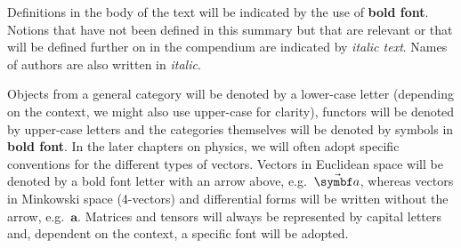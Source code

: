 \documentclass[12pt, a4paper]{report}
\begin{document}
   Definitions in the body of the text will be indicated by the use of \textbf{bold font}. Notions that have not been defined in this summary but that are relevant or that will be defined further on in the compendium are indicated by \textit{italic text}. Names of authors are also written in \textit{italic}.

   Objects from a general category will be denoted by a lower-case letter (depending on the context, we might also use upper-case for clarity), functors will be denoted by upper-case letters and the categories themselves will be denoted by symbols in \textbf{bold font}. In the later chapters on physics, we will often adopt specific conventions for the different types of vectors. Vectors in Euclidean space will be denoted by a bold font letter with an arrow above, e.g.~$\vector{a}$, whereas vectors in Minkowski space (4-vectors) and differential forms will be written without the arrow, e.g.~$\symbf{a}$. Matrices and tensors will always be represented by capital letters and, dependent on the context, a specific font will be adopted.

% 
% 
% 
% 
% 

% 
% 
% 
% 
% 
% 
% 
% 

% 
% 

% 
% 
% 

% 
% 
% 
% 
% 
% 
% 
\end{document}
